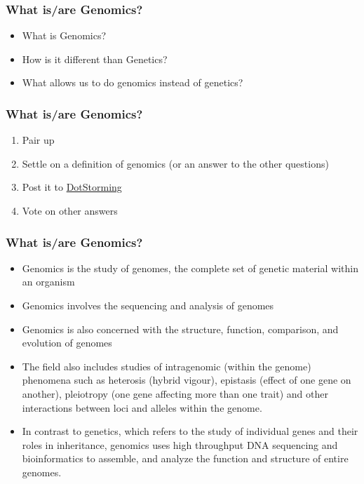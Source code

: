 \documentclass[14pt]{beamer}
\begin{document}
\begin{frame}
\frametitle{What is/are Genomics?}
\begin{itemize}
	\item What is Genomics?
	\item How is it different than Genetics?
	\item What allows us to do genomics instead of genetics?
\end{itemize}
\end{frame}

\begin{frame}
\frametitle{What is/are Genomics?}
	\begin{enumerate}
		\item<+-> Pair up
		\item<+-> Settle on a definition of genomics (or an answer to the other questions)
		\item<+-> Post it to \href{https://dotstorming.com/b/59ae934397b729fa05814972}{DotStorming}
		\item<+-> Vote on other answers
	\end{enumerate}
\end{frame}

\begin{frame}
\frametitle{What is/are Genomics?}


\footnotesize
\begin{itemize}
	\item<2-> Genomics is the study of genomes, the complete set of genetic material within an organism
	\item<3-> Genomics involves the sequencing and analysis of genomes
	\item<4-> Genomics is also concerned with the structure, function, comparison, and evolution of genomes
	\item<5-> The field also includes studies of intragenomic (within the genome) phenomena such as heterosis (hybrid vigour), epistasis (effect of one gene on another), pleiotropy (one gene affecting more than one trait) and other interactions between loci and alleles within the genome.
	\item<6-> In contrast to genetics, which refers to the study of individual genes and their roles in inheritance, genomics uses high throughput DNA sequencing and bioinformatics to assemble, and analyze the function and structure of entire genomes.
\end{itemize}
\normalsize

\end{frame}
\end{document}
